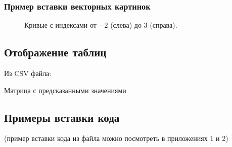 \pagebreak
\subsubsection{Пример вставки векторных картинок}
\begin{figure}[h]
  \vspace{14pt}
  \begin{center}
    \begin{minipage}[h]{0.16\linewidth}
      
    \end{minipage}
    \begin{minipage}[h]{0.16\linewidth}
      
    \end{minipage}
    \begin{minipage}[h]{0.16\linewidth}
      
    \end{minipage}
    \begin{minipage}[h]{0.16\linewidth}
      
    \end{minipage}
    \begin{minipage}[h]{0.16\linewidth}
      
    \end{minipage}
    \begin{minipage}[h]{0.16\linewidth}
      
    \end{minipage}

    \vspace{14pt}
    \caption{Кривые с индексами от $-2$ (слева) до $3$ (справа).}
  \end{center}
\end{figure}

\subsection{Отображение таблиц}
Из CSV файла:
\begin{table}[h]
  \centering
  \caption{Матрица с предсказанными значениями}
\end{table}

\subsection{Примеры вставки кода}
(пример вставки кода из файла можно посмотреть в приложениях 1 и 2)

